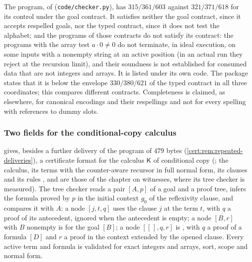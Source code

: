 The program, of  (\texttt{code/checker.py}), has
$315/361/603$ against $321/371/618$ for its control under the goal contract. It
satisfies neither the goal contract, since it accepts respelled goals, nor the
typed contract, since it does not test the alphabet; and the programs of those
contracts do not satisfy its contract: the programs with the array test
$a\cdot 0\neq 0$ do not terminate, in ideal execution, on some inputs with a
nonempty string at an active position (in an actual run they reject at the
recursion limit), and their soundness is not established for consumed data that
are not integers and arrays. It is listed under its own code. The package
states that it is below the envelope $330/380/621$ of the typed contract in all
three coordinates; this compares different contracts. Completeness is claimed,
as elsewhere, for canonical encodings and their respellings and not for every
spelling with references to dummy slots.

\subsubsection*{Two fields for the conditional-copy calculus}

 gives, besides a further delivery of the program of $479$
bytes (\cref{cert:rem:repeated-deliveries}), a certificate format for the
calculus $\mathsf K$ of conditional copy (; the calculus,
its terms with the counter-aware recursor in full normal form, its clauses and
its rules ,  and  are those of
the chapter on witnesses, where its tree checker is measured). The tree
checker reads a pair $[A,p]$ of a goal and a proof tree, infers the formula
proved by $p$ in the initial context $g_0$ of the reflexivity clause, and
compares it with $A$: a node $[j,t,q]$ uses the clause $j$ at the term $t$,
with $q$ a proof of its antecedent, ignored when the antecedent is empty; a
node $[B,r]$ with $B$ nonempty is  for the goal $[B]$; a node
$[[\,],q,r]$ is , with $q$ a proof of a formula $[D]$ and $r$ a
proof in the context extended by the opened clause. Every active term and
formula is validated for exact integers and arrays, sort, scope and normal
form.

